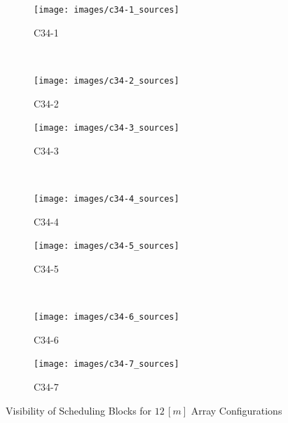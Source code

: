 \begin{figure}
        \centering
        \begin{subfigure}[b]{0.49\textwidth}
                \texttt{[image: images/c34-1\_sources]}
                \caption{C34-1} 
        \end{subfigure} 
        ~ %
%
        \begin{subfigure}[b]{0.49\textwidth}
                \texttt{[image: images/c34-2\_sources]}
                \caption{C34-2}
        \end{subfigure}

        \begin{subfigure}[b]{0.49\textwidth}
                \texttt{[image: images/c34-3\_sources]}
                \caption{C34-3}
        \end{subfigure}
        ~ 
        \begin{subfigure}[b]{0.49\textwidth}
                \texttt{[image: images/c34-4\_sources]}
                \caption{C34-4}
        \end{subfigure}%
        
        \begin{subfigure}[b]{0.49\textwidth}
                \texttt{[image: images/c34-5\_sources]}
                \caption{C34-5}
        \end{subfigure}
        ~
        \begin{subfigure}[b]{0.49\textwidth}
                \texttt{[image: images/c34-6\_sources]}
                \caption{C34-6}
        \end{subfigure}
        
        \begin{subfigure}[b]{0.49\textwidth}
                \texttt{[image: images/c34-7\_sources]}
                \caption{C34-7}
        \end{subfigure}           
          
        \caption{Visibility of Scheduling Blocks for $12\,[m]$ Array Configurations}
        \label{fig:results-sb-critical-set}
\end{figure}
